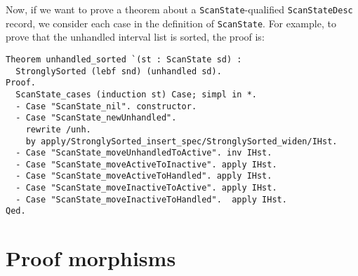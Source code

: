 \documentclass{llncs}
\begin{document}
Now, if we want to prove a theorem about a
\texttt{ScanState}-qualified \texttt{ScanStateDesc} record, we
consider each case in the definition of \texttt{ScanState}.
For example, to prove that the unhandled interval list is sorted, the
proof is:

\begin{verbatim}
Theorem unhandled_sorted `(st : ScanState sd) :
  StronglySorted (lebf snd) (unhandled sd).
Proof.
  ScanState_cases (induction st) Case; simpl in *.
  - Case "ScanState_nil". constructor.
  - Case "ScanState_newUnhandled".
    rewrite /unh.
    by apply/StronglySorted_insert_spec/StronglySorted_widen/IHst.
  - Case "ScanState_moveUnhandledToActive". inv IHst.
  - Case "ScanState_moveActiveToInactive". apply IHst.
  - Case "ScanState_moveActiveToHandled". apply IHst.
  - Case "ScanState_moveInactiveToActive". apply IHst.
  - Case "ScanState_moveInactiveToHandled".  apply IHst.
Qed.
\end{verbatim}






\section{Proof morphisms}
\label{sec:pfmorph}
\end{document}
